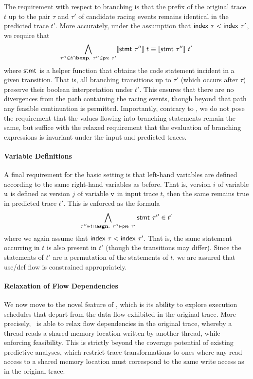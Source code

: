 The requirement with respect to branching is that the prefix of the original trace $t$ up to the pair $\tau$ and $\tau'$ of candidate racing events remains identical in the predicted trace $t'$. More accurately, under the assumption that ${\sf index}\ \tau < {\sf index}\ \tau'$, 
we require that 
$$
\bigwedge_{\tau'' \in t \cap {\bf bexp}.\
	\tau'' \in {\sf pre}\ \tau'} \lbrack\!\lbrack {\sf stmt}\ \tau'' \rbrack\!\rbrack\ t \equiv \lbrack\!\lbrack {\sf stmt}\ \tau'' \rbrack\!\rbrack\ t'
$$ 
where ${\sf stmt}$ is a helper function that obtains the code statement incident in a given transition. That is, all branching transitions up to $\tau'$ (which occurs after $\tau$) preserve their boolean interpretation under $t'$. This ensures that there are no divergences from the path containing the racing events, though beyond that path any feasible continuation is permitted. Importantly, contrary to \cite{JEFF-PLDI14}, we do not pose the requirement that the values flowing into branching statements remain the same, but suffice with the relaxed requirement that the evaluation of branching expressions is invariant under the input and predicted traces.

\paragraph{Variable Definitions}

A final requirement for the basic setting is that left-hand variables are defined according to the same right-hand variables as before. That is, version $i$ of variable ${\tt u}$ is defined as version $j$ of variable ${\tt v}$ in input trace $t$, then the same remains true in predicted  trace $t'$. This is enforced as the formula
$$
\bigwedge_{\tau'' \in t \cap {\bf asgn}.\
	\tau'' \in {\sf pre}\ \tau'} {\sf stmt}\ \tau'' \in t' 
$$
where we again assume that ${\sf index}\ \tau < {\sf index}\ \tau'$. That is, the same statement occurring in $t$ is also present in $t'$ (though the transitions may differ). Since the statements of $t'$ are a permutation of the statements of $t$, we are assured that use/def flow is constrained appropriately.

\paragraph{Relaxation of Flow Dependencies}

We now move to the novel feature of \tool, which is its ability to explore execution schedules that depart from the data flow exhibited in the original trace. More precisely, \tool\ is able to relax flow dependencies in the original trace, whereby a thread reads a shared memory location written by another thread, while enforcing feasibility. This is strictly beyond the coverage potential of existing predictive analyses, which restrict trace transformations to ones where any read access to a shared memory location must correspond to the same write access as in the original trace.

